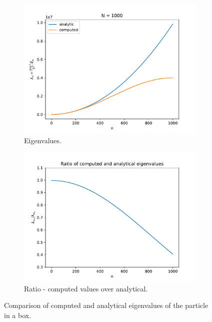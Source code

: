 \documentclass{article}
\begin{document}
\begin{figure}[H]
    \begin{subfigure}[b]{0.5\textwidth}
        \includegraphics[width=\textwidth]{./media/eigenvalues_empty_box.pdf}
        \caption{Eigenvalues.}
        \label{fig:box-eigenvals}
    \end{subfigure}
    \begin{subfigure}[b]{0.5\textwidth}
        \includegraphics[width=\textwidth]{./media/eigenval_ratio_empty_box.pdf}
        \caption{Ratio - computed values over analytical.}
        \label{fig:box-eigenvals-ratio}
    \end{subfigure}
    \caption{Comparison of computed and analytical eigenvalues of the particle in a box.}
\end{figure}
\end{document}
